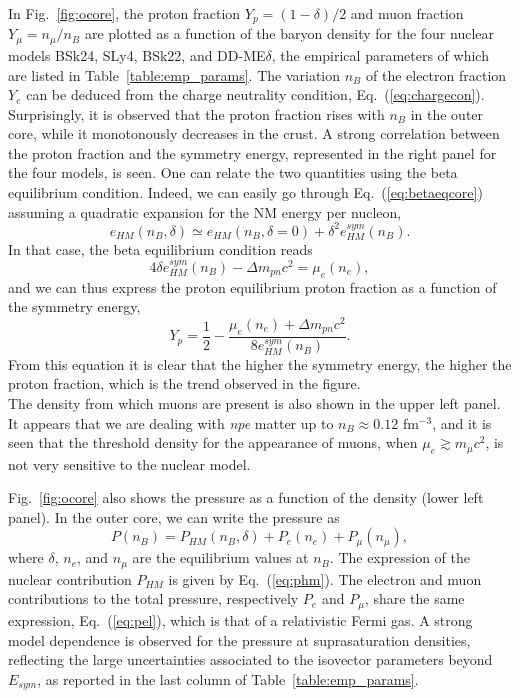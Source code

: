 In Fig.~\ref{fig:ocore}, the proton fraction $Y_p=(1-\delta)/2$ and muon 
fraction $Y_\mu = n_\mu/n_B$ are plotted as a function of the baryon density 
for the four nuclear models BSk24, SLy4, BSk22, and DD-ME$\delta$, the
empirical parameters of which are listed in Table~\ref{table:emp_params}. The
variation $n_B$ of the electron fraction $Y_e$ can be deduced from the
charge neutrality condition, Eq.~(\ref{eq:chargecon}). Surprisingly, it is
observed that the proton fraction rises with $n_B$ in the outer core, while 
it monotonously decreases in the crust. 
A strong correlation between the proton fraction and the symmetry energy,
represented in the right panel for the four models, is seen. One can relate the 
two quantities using the beta equilibrium condition. Indeed, we can easily go 
through Eq.~(\ref{eq:betaeqcore}) assuming a quadratic expansion for the NM 
energy per nucleon,
%
\begin{equation}
  e_{HM}(n_B,\delta) \simeq e_{HM}(n_B,\delta=0) + \delta^2 e_{HM}^{sym}(n_B).
\end{equation}
%
In that case, the beta equilibrium condition reads
%
\begin{equation}
  4\delta e_{HM}^{sym}(n_B) - \Delta m_{pn}c^2 = \mu_e(n_e),
\end{equation}
%
and we can thus express the proton equilibrium proton fraction as a function of 
the symmetry energy,
%
\begin{equation}
  Y_p = \frac{1}{2} - \frac{\mu_e(n_e) 
  + \Delta m_{pn}c^2}{8e_{HM}^{sym}(n_B)}.
\end{equation}
%
From this equation it is clear that the higher the symmetry energy, the higher
the proton fraction, which is the trend observed in the figure.\\
The density from which muons are present is also shown in the upper left
panel. It appears that we are dealing with \textit{npe} matter up to 
$n_B \approx 0.12$ fm$^{-3}$, and it is seen that the threshold density for the
appearance of muons, when $\mu_e \gtrsim m_\mu c^2$, is not very sensitive to 
the nuclear model.

Fig.~\ref{fig:ocore} also shows the pressure as a function of the density
(lower left panel). In the outer core, we can write the pressure as
%
\begin{equation}
  P(n_B) = P_{HM}(n_B, \delta) + P_e(n_e) + P_\mu(n_\mu),
\end{equation}
%
where $\delta$, $n_e$, and $n_\mu$ are the equilibrium values at $n_B$. The
expression of the nuclear contribution $P_{HM}$ is given by
Eq.~(\ref{eq:phm}). The electron and muon contributions to the total pressure, 
respectively $P_e$ and $P_\mu$, share the same expression, Eq.~(\ref{eq:pel}), 
which is that of a relativistic Fermi gas. A strong model dependence is
observed for the pressure at suprasaturation densities, reflecting the large
uncertainties associated to the isovector parameters beyond $E_{sym}$, as
reported in the last column of Table~\ref{table:emp_params}.

